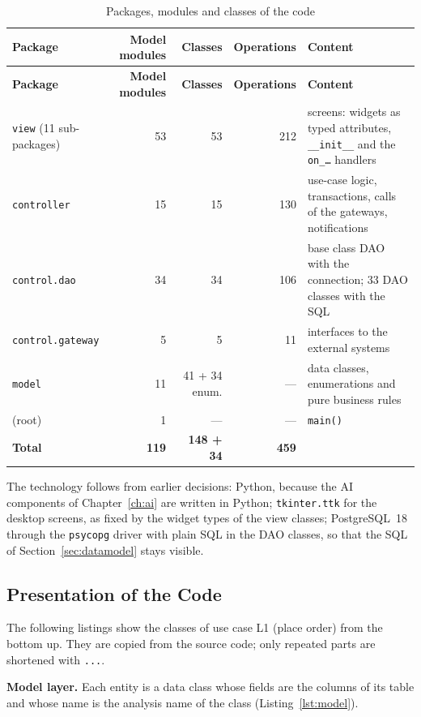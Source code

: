 {\small
\begin{xltabular}{\textwidth}{@{}L{3.2cm} r r r Y@{}}
\caption{Packages, modules and classes of the code}\label{tab:packages}\\
\toprule
\textbf{Package} & \textbf{Model modules} & \textbf{Classes} & \textbf{Operations} & \textbf{Content} \\ \midrule
\endfirsthead
\toprule
\textbf{Package} & \textbf{Model modules} & \textbf{Classes} & \textbf{Operations} & \textbf{Content} \\ \midrule
\endhead
\bottomrule
\endlastfoot
\texttt{view} (11 sub-packages) & 53 & 53 & 212 & screens: widgets as typed attributes, \texttt{\_\_init\_\_} and the \texttt{on\_\ldots} handlers \\
\texttt{controller} & 15 & 15 & 130 & use-case logic, transactions, calls of the gateways, notifications \\
\texttt{control.dao} & 34 & 34 & 106 & base class \textsf{DAO} with the connection; 33 DAO classes with the SQL \\
\texttt{control.gateway} & 5 & 5 & 11 & interfaces to the external systems \\
\texttt{model} & 11 & 41 + 34 enum. & --- & data classes, enumerations and pure business rules \\
(root) & 1 & --- & --- & \texttt{main()} \\ \midrule
\textbf{Total} & \textbf{119} & \textbf{148 + 34} & \textbf{459} & \\
\end{xltabular}
}

The technology follows from earlier decisions: Python, because the AI components of Chapter~\ref{ch:ai} are written in Python; \texttt{tkinter.ttk} for the desktop screens, as fixed by the widget types of the view classes; PostgreSQL~18 through the \texttt{psycopg} driver with plain SQL in the DAO classes, so that the SQL of Section~\ref{sec:datamodel} stays visible.

\subsection{Presentation of the Code}
\label{subsec:codeexcerpts}
The following listings show the classes of use case L1 (place order) from the bottom up. They are copied from the source code; only repeated parts are shortened with \texttt{...}.

\textbf{Model layer.} Each entity is a data class whose fields are the columns of its table and whose name is the analysis name of the class (Listing~\ref{lst:model}).

